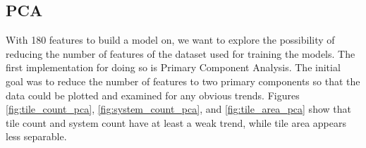 \documentclass{article}
\begin{document}
	
	\subsection{PCA}
	With 180 features to build a model on, we want to explore the possibility of reducing the number of features of the dataset used for training the models. The first implementation for doing so is Primary Component Analysis. The initial goal was to reduce the number of features to two primary components so that the data could be plotted and examined for any obvious trends. Figures \ref*{fig:tile_count_pca}, \ref*{fig:system_count_pca}, and \ref*{fig:tile_area_pca} show that tile count and system count have at least a weak trend, while tile area appears less separable.
	
	
		\begin{minipage}{.5\linewidth}
			\centering
		\end{minipage}%
\end{document}
